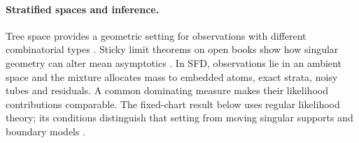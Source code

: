\paragraph{Stratified spaces and inference.}
Tree space provides a geometric setting for observations with different
combinatorial types \citep{billera2001geometry}. Sticky limit theorems on
open books show how singular geometry can alter mean asymptotics
\citep{hotz2013sticky}. In SFD, observations lie in an ambient space and
the mixture allocates mass to embedded atoms, exact strata, noisy tubes and
residuals. A common dominating measure makes their likelihood contributions
comparable. The fixed-chart result below uses regular likelihood theory;
its conditions distinguish that setting from moving singular supports and
boundary models \citep{vandervaart1998asymptotic}.
